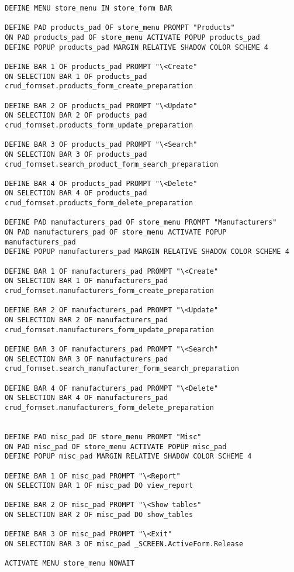 \begin{lstlisting}[caption=store\_form procedures]
DEFINE MENU store_menu IN store_form BAR

DEFINE PAD products_pad OF store_menu PROMPT "Products"
ON PAD products_pad OF store_menu ACTIVATE POPUP products_pad
DEFINE POPUP products_pad MARGIN RELATIVE SHADOW COLOR SCHEME 4

DEFINE BAR 1 OF products_pad PROMPT "\<Create"
ON SELECTION BAR 1 OF products_pad crud_formset.products_form_create_preparation

DEFINE BAR 2 OF products_pad PROMPT "\<Update"
ON SELECTION BAR 2 OF products_pad crud_formset.products_form_update_preparation

DEFINE BAR 3 OF products_pad PROMPT "\<Search"
ON SELECTION BAR 3 OF products_pad crud_formset.search_product_form_search_preparation

DEFINE BAR 4 OF products_pad PROMPT "\<Delete"
ON SELECTION BAR 4 OF products_pad crud_formset.products_form_delete_preparation

DEFINE PAD manufacturers_pad OF store_menu PROMPT "Manufacturers"
ON PAD manufacturers_pad OF store_menu ACTIVATE POPUP manufacturers_pad
DEFINE POPUP manufacturers_pad MARGIN RELATIVE SHADOW COLOR SCHEME 4

DEFINE BAR 1 OF manufacturers_pad PROMPT "\<Create"
ON SELECTION BAR 1 OF manufacturers_pad crud_formset.manufacturers_form_create_preparation

DEFINE BAR 2 OF manufacturers_pad PROMPT "\<Update"
ON SELECTION BAR 2 OF manufacturers_pad crud_formset.manufacturers_form_update_preparation

DEFINE BAR 3 OF manufacturers_pad PROMPT "\<Search"
ON SELECTION BAR 3 OF manufacturers_pad crud_formset.search_manufacturer_form_search_preparation

DEFINE BAR 4 OF manufacturers_pad PROMPT "\<Delete"
ON SELECTION BAR 4 OF manufacturers_pad crud_formset.manufacturers_form_delete_preparation


DEFINE PAD misc_pad OF store_menu PROMPT "Misc"
ON PAD misc_pad OF store_menu ACTIVATE POPUP misc_pad
DEFINE POPUP misc_pad MARGIN RELATIVE SHADOW COLOR SCHEME 4

DEFINE BAR 1 OF misc_pad PROMPT "\<Report"
ON SELECTION BAR 1 OF misc_pad DO view_report

DEFINE BAR 2 OF misc_pad PROMPT "\<Show tables"
ON SELECTION BAR 2 OF misc_pad DO show_tables

DEFINE BAR 3 OF misc_pad PROMPT "\<Exit"
ON SELECTION BAR 3 OF misc_pad _SCREEN.ActiveForm.Release

ACTIVATE MENU store_menu NOWAIT
\end{lstlisting}

